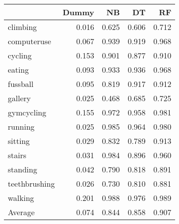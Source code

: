 \begin{tabular}{lrrrr}
\toprule
{} &  Dummy &    NB &    DT &    RF \\
\midrule
climbing      &  0.016 & 0.625 & 0.606 & 0.712 \\
computeruse   &  0.067 & 0.939 & 0.919 & 0.968 \\
cycling       &  0.153 & 0.901 & 0.877 & 0.910 \\
eating        &  0.093 & 0.933 & 0.936 & 0.968 \\
fussball      &  0.095 & 0.819 & 0.917 & 0.912 \\
gallery       &  0.025 & 0.468 & 0.685 & 0.725 \\
gymcycling    &  0.155 & 0.972 & 0.958 & 0.981 \\
running       &  0.025 & 0.985 & 0.964 & 0.980 \\
sitting       &  0.029 & 0.832 & 0.789 & 0.913 \\
stairs        &  0.031 & 0.984 & 0.896 & 0.960 \\
standing      &  0.042 & 0.790 & 0.818 & 0.891 \\
teethbrushing &  0.026 & 0.730 & 0.810 & 0.881 \\
walking       &  0.201 & 0.988 & 0.976 & 0.989 \\
Average       &  0.074 & 0.844 & 0.858 & 0.907 \\
\bottomrule
\end{tabular}
